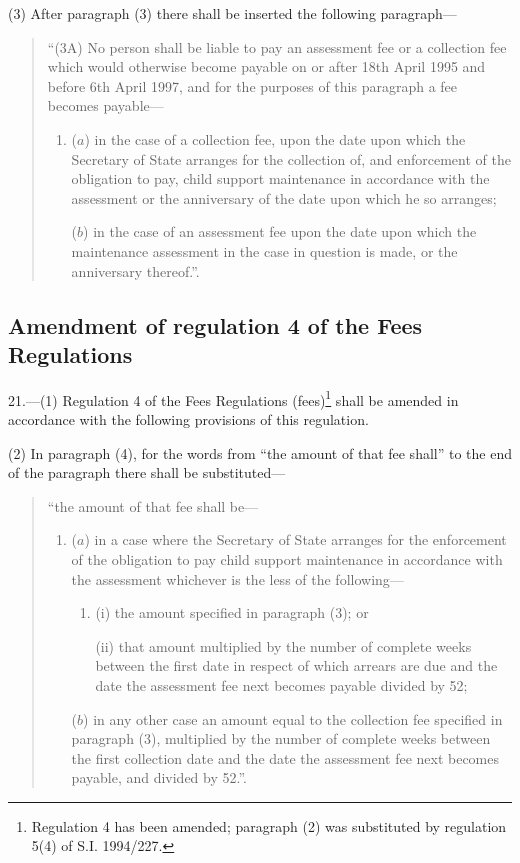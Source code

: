 \documentclass[12pt,a4paper]{article}
\begin{document}
(3) After paragraph (3) there shall be inserted the following paragraph—
\begin{quotation}
“(3A) No person shall be liable to pay an assessment fee or a collection fee which would otherwise become payable on or after 18th April 1995 and before 6th April 1997, and for the purposes of this paragraph a fee becomes payable—
\begin{enumerate}\item[]
($a$) in the case of a collection fee, upon the date upon which the Secretary of State arranges for the collection of, and enforcement of the obligation to pay, child support maintenance in accordance with the assessment or the anniversary of the date upon which he so arranges;

($b$) in the case of an assessment fee upon the date upon which the maintenance assessment in the case in question is made, or the anniversary thereof.”.
\end{enumerate}
\end{quotation}

\subsection[21. Amendment of regulation 4 of the Fees Regulations]{Amendment of regulation 4 of the Fees Regulations}

21.—(1) Regulation 4 of the Fees Regulations (fees)\footnote{\frenchspacing Regulation 4 has been amended; paragraph (2) was substituted by regulation 5(4) of S.I. 1994/227.} shall be amended in accordance with the following provisions of this regulation.

(2) In paragraph (4), for the words from “the amount of that fee shall” to the end of the paragraph there shall be substituted—
\begin{quotation}
“the amount of that fee shall be—
\begin{enumerate}\item[]
($a$) in a case where the Secretary of State arranges for the enforcement of the obligation to pay child support maintenance in accordance with the assessment whichever is the less of the following—
\begin{enumerate}\item[]
(i) the amount specified in paragraph (3); or

(ii) that amount multiplied by the number of complete weeks between the first date in respect of which arrears are due and the date the assessment fee next becomes payable divided by 52;
\end{enumerate}

($b$) in any other case an amount equal to the collection fee specified in paragraph (3), multiplied by the number of complete weeks between the first collection date and the date the assessment fee next becomes payable, and divided by 52.”.
\end{enumerate}
\end{quotation}
\end{document}
